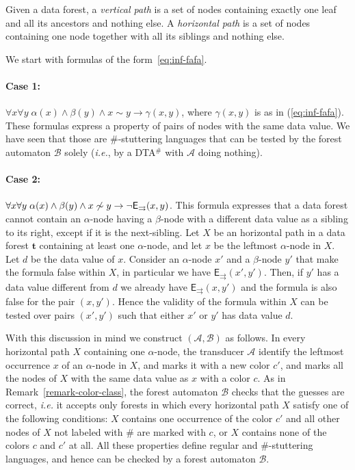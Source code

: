 \documentclass{CSML}
\newcommand\dataeq{\ensuremath{\sim}}
\newcommand\dad{\textup{DTA}$^\#$\xspace}
\newcommand\Aa{\mathcal{A}}
\newcommand\Ba{\mathcal{B}}
\newcommand\tree{\boldsymbol{t}}
\newcommand\EE{\mathsf{E}}
\newcommand\SFS{\EE_{\rightrightarrows}}
\begin{document}
Given a data forest, a \emph{vertical path} is a set of nodes containing exactly
one leaf and all its ancestors and nothing else.  A \emph{horizontal path} is a
set of nodes containing one node together with all its siblings and nothing else.



\medskip\noindent
We start with formulas of the form~\eqref{eq:inf-fafa}. 

\paragraph{\bf Case 1:}
$\forall x \forall y\; \alpha(x) \wedge \beta(y) \wedge x \dataeq y \to \gamma(x, y)$,
where $\gamma(x, y)$ is as in (\ref{eq:inf-fafa}).
These formulas express a property of pairs of nodes with the same data value.
We have seen that those are $\#$-stuttering languages that can be tested
by the forest automaton $\Ba$ solely (\textit{i.e.}, by a \dad with $\Aa$ doing
nothing).


\paragraph{\bf Case 2:}
$\forall x \forall y\; \alpha(x) \wedge \beta(y) 
 \wedge x \not\dataeq y \to \neg \SFS(x, y)$.
This formula expresses that a data forest cannot contain 
an $\alpha$-node having a $\beta$-node with a different data value
as a sibling to its right, except if it is the next-sibling.
Let $X$ be an horizontal path in a data forest $\tree$ containing at least one
$\alpha$-node, and let $x$ be the leftmost $\alpha$-node in $X$. 
Let $d$ be the data value of $x$. 
Consider an $\alpha$-node $x'$ and a $\beta$-node $y'$ that make the formula
false within $X$, in particular we have $\SFS(x',y')$. Then, if $y'$ has a data
value different from $d$ we already have $\SFS(x,y')$ and the formula is
also false for the pair $(x,y')$.
Hence the validity of the formula within $X$ can be tested over pairs $(x',y')$ such that
either $x'$ or $y'$ has data value $d$.

\noindent
With this discussion in mind we construct $(\Aa,\Ba)$ as follows. In every horizontal path $X$
containing one $\alpha$-node, the transducer $\Aa$ identify the leftmost
occurrence $x$ of an $\alpha$-node in $X$, and marks it with a new color $c'$, 
and marks all the nodes of $X$ with the same data value as $x$ with a color $c$.  
As in Remark~\ref{remark-color-class}, the forest automaton $\Ba$ checks that the
guesses are correct, \textit{i.e.} it accepts only forests in which every horizontal
path $X$ satisfy one of the following conditions: 
$X$ contains one occurrence of the color $c'$ 
and all other nodes of $X$ not labeled with $\#$ are marked with $c$, 
or $X$ contains none of the colors $c$ and $c'$ at all. 
All these properties define regular and $\#$-stuttering languages, 
and hence can be checked by a forest automaton $\Ba$.
\end{document}

